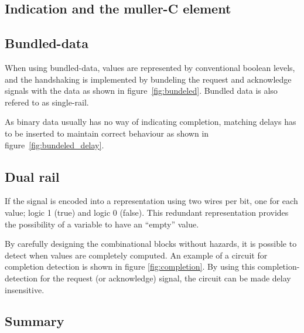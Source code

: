 \subsection{Indication and the muller-C element}

\subsection{Bundled-data}

When using bundled-data, values are represented by conventional
boolean levels, and the handshaking is implemented by bundeling the
request and acknowledge signals with the data as shown in
figure~\ref{fig:bundeled}. Bundled data is also refered to as
single-rail.

As binary data usually has no way of indicating completion, matching
delays has to be inserted to maintain correct behaviour as shown in
figure~\ref{fig:bundeled_delay}.

\subsection{Dual rail}

If the signal is encoded into a representation using two wires per
bit, one for each value; logic 1 (true) and logic 0 (false). This
redundant representation provides the possibility of a variable to
have an ``empty'' value. 

By carefully designing the combinational blocks without hazards, it is
possible to detect when values are completely computed. An example of
a circuit for completion detection is shown in figure
\ref{fig:completion}. By using this completion-detection for the
request (or acknowledge) signal, the circuit can be made delay
insensitive.

\subsection{Summary}



